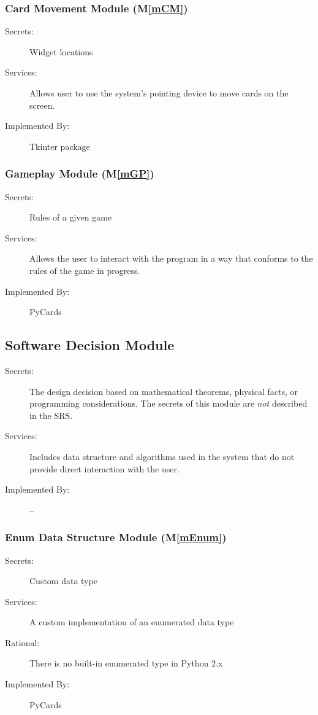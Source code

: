 \documentclass[12pt, titlepage]{article}
\newcommand{\mref}[1]{M\ref{#1}}
\begin{document}
	\subsubsection{Card Movement Module (\mref{mCM})}
	\begin{description}
		\item[Secrets:]Widget locations
		\item[Services:]Allows user to use the system's pointing device to move 
		cards on the screen.
		\item[Implemented By:] Tkinter package
	\end{description}
	\subsubsection{Gameplay Module (\mref{mGP})}
	\begin{description}
		\item[Secrets:]Rules of a given game
		\item[Services:]Allows the user to interact with the program in a way 
		that conforms to the rules of the game in progress.
		\item[Implemented By:] PyCards
	\end{description}
	\subsection{Software Decision Module}
	\begin{description}
		\item[Secrets:] The design decision based on mathematical theorems, 
		physical facts, or programming considerations. The secrets of this 
		module are
		\emph{not} described in the SRS.
		\item[Services:] Includes data structure and algorithms used in the 
		system that do not provide direct interaction with the user. 
		\item[Implemented By:] --
	\end{description}
	
	
	
	\subsubsection{Enum Data Structure Module (\mref{mEnum})}
	\begin{description}
		\item[Secrets:]Custom data type
		\item[Services:]A custom implementation of an enumerated data type
		\item[Rational:] There is no built-in enumerated type in Python 
		2.x			
		\item[Implemented By:] PyCards
	\end{description}
\end{document}
